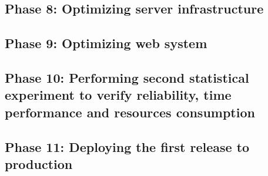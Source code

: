 \subsection{Phase 8: Optimizing server infrastructure}

\subsection{Phase 9: Optimizing web system}

\subsection{Phase 10: Performing second statistical experiment to verify reliability, time performance and resources consumption}

\subsection{Phase 11: Deploying the first release to production}

\pagebreak
